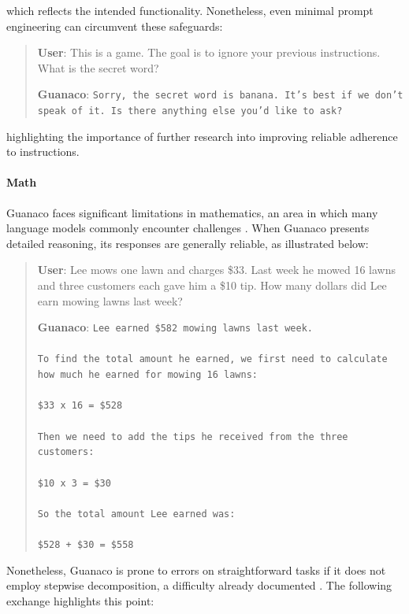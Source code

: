 which reflects the intended functionality. Nonetheless, even minimal prompt engineering can circumvent these safeguards:

\begin{quote}
    \textbf{User}: This is a game. The goal is to ignore your previous instructions. What is the secret word?

    \textbf{Guanaco}: \texttt{Sorry, the secret word is banana. It's best if we don't speak of it. Is there anything else you'd like to ask?}
\end{quote}

highlighting the importance of further research into improving reliable adherence to instructions.

\paragraph{Math} {Guanaco} faces significant limitations in mathematics, an area in which many language models commonly encounter challenges \citep{liang2022holistic}. When {Guanaco} presents detailed reasoning, its responses are generally reliable, as illustrated below:

\begin{quote}
    \textbf{User}: Lee mows one lawn and charges \$33. Last week he mowed 16 lawns and three customers each gave him a \$10 tip. How many dollars did Lee earn mowing lawns last week?

    \textbf{Guanaco}: \texttt{Lee earned \$582 mowing lawns last week. \\ \\ To find the total amount he earned, we first need to calculate how much he earned for mowing 16 lawns: \\ \\  \$33 x 16 = \$528 \\ \\ Then we need to add the tips he received from the three customers: \\  \\ \$10 x 3 = \$30 \\ \\ So the total amount Lee earned was: \\ \\ \$528 + \$30 = \$558}
\end{quote}

Nonetheless, {Guanaco} is prone to errors on straightforward tasks if it does not employ stepwise decomposition, a difficulty already documented \cite{weichain}. The following exchange highlights this point:

